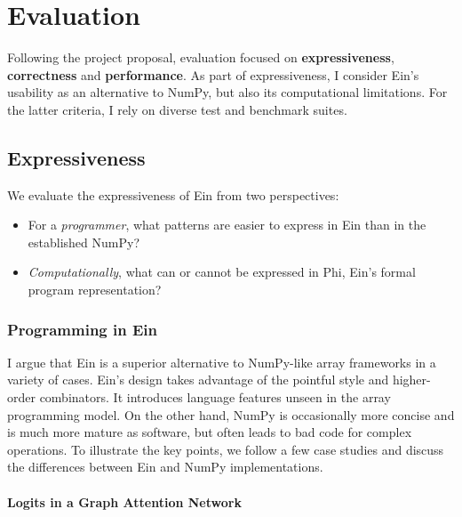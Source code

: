 \chapter{Evaluation}

Following the project proposal, evaluation focused on \textbf{expressiveness}, \textbf{correctness} and \textbf{performance}.
As part of expressiveness, I consider Ein's usability as an alternative to NumPy, but also its computational limitations. For the latter criteria, I rely on diverse test and benchmark suites.

\section{Expressiveness}

We evaluate the expressiveness of Ein from two perspectives: \begin{itemize}
    \item For a \textit{programmer}, what patterns are easier to express in Ein than in the established NumPy?
    \item \textit{Computationally}, what can or cannot be expressed in Phi, Ein's formal program representation?
\end{itemize}

\subsection{Programming in Ein}

I argue that Ein is a superior alternative to NumPy-like array frameworks in a variety of cases. 
Ein's design takes advantage of the pointful style and higher-order combinators. 
It introduces language features unseen in the array programming model.
On the other hand, NumPy is occasionally more concise and is much more mature as software, but often leads to bad code for complex operations.
To illustrate the key points, we follow a few case studies and discuss the differences between Ein and NumPy implementations.

\subsubsection{Logits in a Graph Attention Network}


